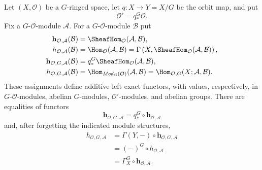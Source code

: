 \begin{lemma}
\label{lemma-equivariant-hom-functors}
\begin{reference}
\cite[Chapter V, \S 5.6, p. 214]{Tohoku}
\end{reference}
Let $(X, \mathcal O)$ be a $G$-ringed space, let
$q : X \to Y = X/G$ be the orbit map, and put
$$
\mathcal O' = q_*^G\mathcal O.
$$
Fix a $G$-$\mathcal O$-module $\mathcal A$. For a
$G$-$\mathcal O$-module $\mathcal B$ put
$$
\begin{aligned}
\mathbf h_{\mathcal O,\mathcal A}(\mathcal B)
&=\SheafHom_{\mathcal O}(\mathcal A,\mathcal B), \\
h_{\mathcal O,\mathcal A}(\mathcal B)
&=\Hom_{\mathcal O}(\mathcal A,\mathcal B)
=\Gamma\left(X,
\SheafHom_{\mathcal O}(\mathcal A,\mathcal B)\right), \\
\mathbf h_{\mathcal O,G,\mathcal A}(\mathcal B)
&=q_*^G\SheafHom_{\mathcal O}(\mathcal A,\mathcal B), \\
h_{\mathcal O,G,\mathcal A}(\mathcal B)
&=\Hom_{\textit{Mod}_G(\mathcal O)}(\mathcal A,\mathcal B)
=\Hom_{\mathcal O,G}(X;\mathcal A,\mathcal B).
\end{aligned}
$$
These assignments define additive left exact functors, with values,
respectively, in $G$-$\mathcal O$-modules, abelian $G$-modules,
$\mathcal O'$-modules, and abelian groups. There are equalities of functors
$$
\mathbf h_{\mathcal O,G,\mathcal A}
=q_*^G\circ\mathbf h_{\mathcal O,\mathcal A}
$$
and, after forgetting the indicated module structures,
$$
\begin{aligned}
h_{\mathcal O,G,\mathcal A}
&=\Gamma(Y,-)\circ\mathbf h_{\mathcal O,G,\mathcal A} \\
&=(-)^G\circ h_{\mathcal O,\mathcal A} \\
&=\Gamma_X^G\circ\mathbf h_{\mathcal O,\mathcal A}.
\end{aligned}
$$
\end{lemma}

